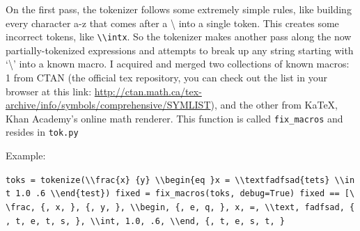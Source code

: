 \documentclass[]{article}
\begin{document}
On the first pass, the tokenizer follows some extremely simple rules,
like building every character a-z that comes after a \textbackslash{}
into a single token. This creates some incorrect tokens, like
\texttt{\textbackslash{}\textbackslash{}intx}. So the tokenizer makes
another pass along the now partially-tokenized expressions and attempts
to break up any string starting with `\textbackslash{}' into a known
macro. I acquired and merged two collections of known macros: 1 from
CTAN (the official tex repository, you can check out the list in your
browser at this link:
\url{http://ctan.math.ca/tex-archive/info/symbols/comprehensive/SYMLIST}),
and the other from KaTeX, Khan Academy's online math renderer. This
function is called \texttt{fix\_macros} and resides in \texttt{tok.py}

Example:

\texttt{toks\ =\ tokenize(\textquotesingle{}\textbackslash{}\textbackslash{}frac\{x\}\ \{y\}\ \textbackslash{}\textbackslash{}begin\{eq\ \}x\ =\ \textbackslash{}\textbackslash{}textfadfsad\{tets\}\ \textbackslash{}\textbackslash{}int\ 1.0\ .6\ \textbackslash{}\textbackslash{}end\{test\}\textquotesingle{})\ fixed\ =\ fix\_macros(toks,\ debug=True)\ fixed\ ==\ {[}\textquotesingle{}\textbackslash{}\textbackslash{}frac\textquotesingle{},\ \textquotesingle{}\{\textquotesingle{},\ \textquotesingle{}x\textquotesingle{},\ \textquotesingle{}\}\textquotesingle{},\ \textquotesingle{}\{\textquotesingle{},\ \textquotesingle{}y\textquotesingle{},\ \textquotesingle{}\}\textquotesingle{},\ \textquotesingle{}\textbackslash{}\textbackslash{}begin\textquotesingle{},\ \textquotesingle{}\{\textquotesingle{},\ \textquotesingle{}e\textquotesingle{},\ \textquotesingle{}q\textquotesingle{},\ \textquotesingle{}\}\textquotesingle{},\ \textquotesingle{}x\textquotesingle{},\ \textquotesingle{}=\textquotesingle{},\ \textquotesingle{}\textbackslash{}\textbackslash{}text\textquotesingle{},\ \textquotesingle{}fadfsad\textquotesingle{},\ \textquotesingle{}\{\textquotesingle{},\ \textquotesingle{}t\textquotesingle{},\ \textquotesingle{}e\textquotesingle{},\ \textquotesingle{}t\textquotesingle{},\ \textquotesingle{}s\textquotesingle{},\ \textquotesingle{}\}\textquotesingle{},\ \textquotesingle{}\textbackslash{}\textbackslash{}int\textquotesingle{},\ \textquotesingle{}1.0\textquotesingle{},\ \textquotesingle{}.6\textquotesingle{},\ \textquotesingle{}\textbackslash{}\textbackslash{}end\textquotesingle{},\ \textquotesingle{}\{\textquotesingle{},\ \textquotesingle{}t\textquotesingle{},\ \textquotesingle{}e\textquotesingle{},\ \textquotesingle{}s\textquotesingle{},\ \textquotesingle{}t\textquotesingle{},\ \textquotesingle{}\}\textquotesingle{}{]}}
\end{document}
